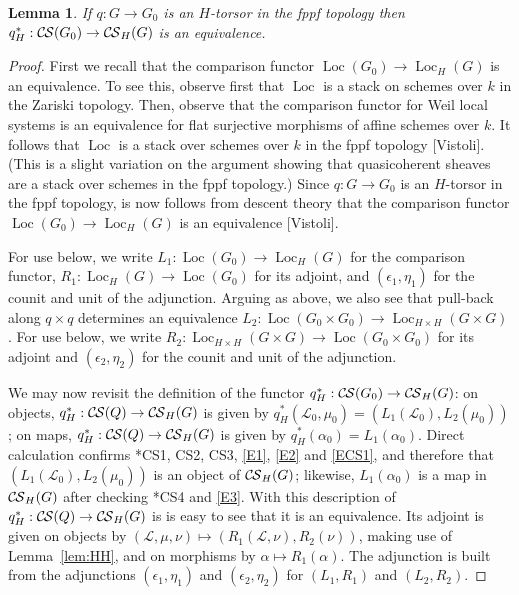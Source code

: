 \documentclass[10pt]{amsart}
\theoremstyle{plain}
\newtheorem{lemma}[theorem]{Lemma}
\theoremstyle{definition}
\newcommand{\Fq}{k}
\DeclareMathOperator{\Loc}{Loc}
\newcommand{\cs}[1]{{\mathcal{#1}}}
\newcommand{\CS}{{\mathcal{C\hskip-0.8pt S}}}
\begin{document}
\begin{lemma}\label{lem:torsor}
If $q : G \to G_0$ is an $H$-torsor in the fppf topology 
then $q_H^*: \CS(G_0) \to \CS_H(G)$ is an equivalence.
\end{lemma}

\begin{proof}
First we recall that the comparison functor 
$\Loc(G_0) \to \Loc_H(G)$ is an equivalence.
To see this, observe first that $\Loc$ is a stack on schemes over $\Fq$ in the Zariski topology.
Then, observe that the comparison functor for Weil local systems is an equivalence for flat surjective morphisms of affine schemes over $\Fq$.
It follows that $\Loc$ is a stack over schemes over $\Fq$ in the fppf topology [Vistoli].
(This is a slight variation on the argument showing that quasicoherent sheaves are a stack over schemes in the fppf topology.)
Since $q : G\to G_0$ is an $H$-torsor in the fppf topology, is now follows from descent theory that the comparison functor $\Loc(G_0) \to \Loc_H(G)$ is an equivalence [Vistoli]. 

For use below, we write $L_1 : \Loc(G_0) \to \Loc_H(G)$ for the comparison functor, $R_1 : \Loc_H(G) \to \Loc(G_0)$ for its adjoint, and $(\epsilon_1, \eta_1)$ for the counit and unit of the adjunction.
%
Arguing as above, we also see that pull-back along $q\times q$ determines an equivalence $L_2 : \Loc(G_0\times G_0) \to \Loc_{H\times H}(G\times G)$.
For use below, we write $R_2 : \Loc_{H\times H}(G\times G) \to \Loc(G_0\times G_0)$ for its adjoint and $(\epsilon_2, \eta_2)$ for the counit and unit of the adjunction.

We may now revisit the definition of the functor $q_H^*: \CS(G_0)\to \CS_H(G)$:
on objects, $q_H^*: \CS(Q)\to \CS_H(G)$ is given by $q_H^*(\cs{L}_0,\mu_0) = (L_1(\cs{L}_0), L_2(\mu_0))$; on maps, $q_H^*: \CS(Q)\to \CS_H(G)$ is given by $q_H^*(\alpha_0) = L_1(\alpha_0)$.
Direct calculation confirms \cite{cunningham-roe:13a}*{CS1, CS2, CS3}, \eqref{E1}, \eqref{E2} and \eqref{ECS1}, and therefore that $(L_1(\cs{L}_0), L_2(\mu_0))$ is an object of $\CS_H(G)$; 
likewise, $L_1(\alpha_0)$ is a map in $\CS_H(G)$ after checking \cite{cunningham-roe:13a}*{CS4} and \eqref{E3}.
%
With this description of $q_H^*: \CS(Q)\to \CS_H(G)$ is is easy to see that it is an equivalence.
Its adjoint is given on objects by $(\cs{L},\mu,\nu) \mapsto (R_1(\cs{L},\nu), R_2(\nu))$, making use of Lemma~\ref{lem:HH}, and on morphisms by $\alpha \mapsto R_1(\alpha)$.
The adjunction is built from the adjunctions $(\epsilon_1, \eta_1)$ and $(\epsilon_2, \eta_2)$ for $(L_1,R_1)$ and $(L_2, R_2)$.
\end{proof}
\end{document}
